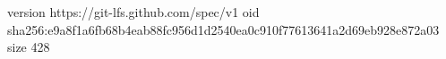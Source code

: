 version https://git-lfs.github.com/spec/v1
oid sha256:e9a8f1a6fb68b4eab88fc956d1d2540ea0c910f77613641a2d69eb928e872a03
size 428
